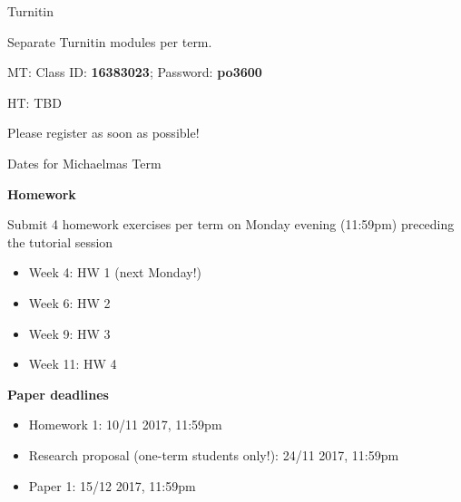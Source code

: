 \documentclass[10pt]{beamer}
\begin{document}
\begin{frame}{Turnitin}

Separate Turnitin modules per term.

MT: Class ID: \textbf{16383023}; Password: \textbf{po3600}

HT: TBD

Please register as soon as possible!
\end{frame}

\begin{frame}{Dates for Michaelmas Term}

\textbf{Homework}

Submit 4 homework exercises per term on Monday evening (11:59pm) preceding the tutorial session

\begin{itemize}
\item Week 4: HW 1 (next Monday!)
\item Week 6: HW 2
\item Week 9: HW 3
\item Week 11: HW 4
\end{itemize}

\textbf{Paper deadlines}

\begin{itemize}
\item Homework 1: 10/11 2017, 11:59pm
\item Research proposal (one-term students only!): 24/11 2017, 11:59pm
\item Paper 1: 15/12 2017, 11:59pm
\end{itemize}

\end{frame}

\begin{comment}
\section{Support \& Additional Material}

\begin{frame}{Support}

\begin{itemize}
\item Constant feedback through short surveys%
\item Notes, useful links and literature: \url{http://muellerstefan.net/research-methods}
\item Questions: mullers@tcd.ie
\end{itemize}

\end{frame}
\end{comment}
\end{document}
